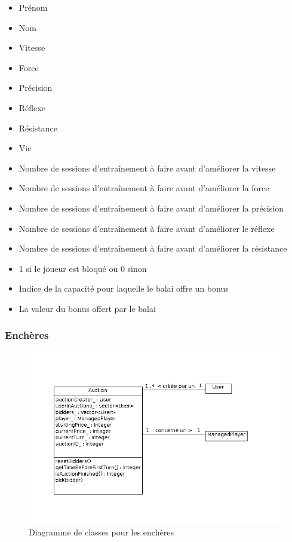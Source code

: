 \documentclass[a4paper,titlepage]{scrreprt}
\begin{document}
          \begin{itemize}
            \item Prénom
            \item Nom
            \item Vitesse
            \item Force 
            \item Précision
            \item Réflexe 
            \item Résistance
            \item Vie
            \item Nombre de sessions d’entraînement à faire avant d’améliorer la vitesse
            \item Nombre de sessions d’entraînement à faire avant d’améliorer la force
            \item Nombre de sessions d’entraînement à faire avant d’améliorer la précision
            \item Nombre de sessions d’entraînement à faire avant d’améliorer le réflexe
            \item Nombre de sessions d’entraînement à faire avant d’améliorer la résistance
            \item 1 si le joueur est bloqué ou 0 sinon 
            \item Indice de la capacité pour laquelle le balai offre un bonus
            \item La valeur du bonus offert par le balai
          \end{itemize}


      \subsubsection{Enchères}
          \begin{figure}[H]
          \center
          \includegraphics[scale=0.4]{uml/class/Auction.png}
         \caption{Diagramme de classes pour les enchères}
         \end{figure}
\end{document}
